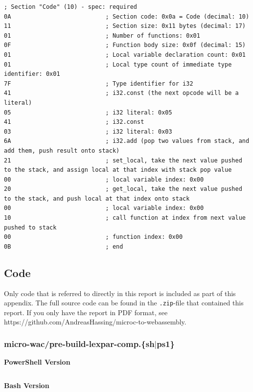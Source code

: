\documentclass[a4paper]{article}
\begin{document}
\begin{verbatim}
; Section "Code" (10) - spec: required
0A                           ; Section code: 0x0a = Code (decimal: 10)
11                           ; Section size: 0x11 bytes (decimal: 17)
01                           ; Number of functions: 0x01
0F                           ; Function body size: 0x0f (decimal: 15)
01                           ; Local variable declaration count: 0x01
01                           ; Local type count of immediate type identifier: 0x01
7F                           ; Type identifier for i32
41                           ; i32.const (the next opcode will be a literal)
05                           ; i32 literal: 0x05
41                           ; i32.const
03                           ; i32 literal: 0x03
6A                           ; i32.add (pop two values from stack, and add them, push result onto stack)
21                           ; set_local, take the next value pushed to the stack, and assign local at that index with stack pop value
00                           ; local variable index: 0x00
20                           ; get_local, take the next value pushed to the stack, and push local at that index onto stack
00                           ; local variable index: 0x00
10                           ; call function at index from next value pushed to stack
00                           ; function index: 0x00
0B                           ; end
\end{verbatim}

\newpage
\subsection{Code}
\label{sec:appendix:code}
Only code that is referred to directly in this report is included as part of this appendix. The full source code can be found in the \texttt{.zip}-file that contained this report. If you only have the report in PDF format, see https://github.com/AndreasHassing/microc-to-webassembly.

\subsubsection{micro-wac/pre-build-lexpar-comp.\{sh$|$ps1\}}
\label{sec:appendix:code:pre-build-lexpar-comp}
\textbf{PowerShell Version}
\inputminted[breaklines,tabsize=2,linenos]{powershell}{../micro-wac/pre-build-lexpar-comp.ps1}

\newpage
\noindent\textbf{Bash Version}
\inputminted[breaklines,tabsize=2,linenos]{bash}{../micro-wac/pre-build-lexpar-comp.sh}
\end{document}
